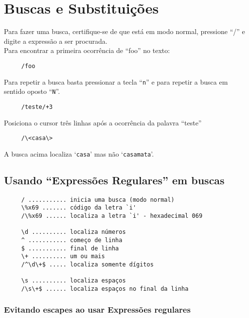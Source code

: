 \chapter{Buscas e Substituições}\label{Buscas e substituições}

Para fazer uma busca, certifique-se de que está em modo normal,
pressione ``/'' e digite a expressão a ser procurada. \\


Para encontrar a primeira ocorrência de ``foo'' no texto:

\begin{verbatim}
     /foo
\end{verbatim}

Para repetir a busca basta pressionar a tecla ``\verb+n+'' e para
repetir a busca em sentido oposto ``\verb+N+''.

\begin{verbatim}
     /teste/+3
\end{verbatim}

Posiciona o cursor três linhas após a ocorrência da palavra ``teste'' \\

\begin{verbatim}
     /\<casa\> 
\end{verbatim}

A busca acima localiza `{\tt casa}' mas não `{\tt casamata}'.


\section{Usando ``Expressões Regulares'' em buscas}

\begin{verbatim}
     / ........... inicia uma busca (modo normal)
     \%x69 ....... código da letra `i'
     /\%x69 ...... localiza a letra `i' - hexadecimal 069
     
     \d .......... localiza números
     ^ ........... começo de linha
     $ ........... final de linha
     \+ .......... um ou mais
     /^\d\+$ ..... localiza somente dígitos
     
     \s .......... localiza espaços
     /\s\+$ ...... localiza espaços no final da linha 
\end{verbatim}

\subsection{Evitando escapes ao usar Expressões regulares}

